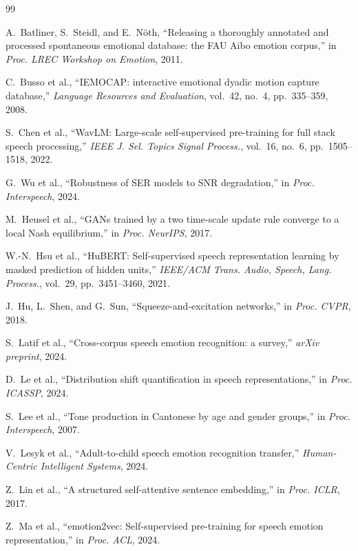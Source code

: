 \documentclass[11pt,a4paper]{article}
\begin{document}
\begin{thebibliography}{99}

A.~Batliner, S.~Steidl, and E.~N\"{o}th,
``{R}eleasing a thoroughly annotated and processed spontaneous emotional database: the {FAU Aibo} emotion corpus,''
in \textit{Proc. LREC Workshop on Emotion}, 2011.

C.~Busso et al.,
``{IEMOCAP}: interactive emotional dyadic motion capture database,''
\textit{Language Resources and Evaluation}, vol.~42, no.~4, pp.~335--359, 2008.

S.~Chen et al.,
``{WavLM}: Large-scale self-supervised pre-training for full stack speech processing,''
\textit{IEEE J. Sel. Topics Signal Process.}, vol.~16, no.~6, pp.~1505--1518, 2022.

G.~Wu et al.,
``Robustness of SER models to SNR degradation,''
in \textit{Proc. Interspeech}, 2024.

M.~Heusel et al.,
``{GANs} trained by a two time-scale update rule converge to a local {Nash} equilibrium,''
in \textit{Proc. NeurIPS}, 2017.

W.-N.~Hsu et al.,
``{HuBERT}: Self-supervised speech representation learning by masked prediction of hidden units,''
\textit{IEEE/ACM Trans. Audio, Speech, Lang. Process.}, vol.~29, pp.~3451--3460, 2021.

J.~Hu, L.~Shen, and G.~Sun,
``{S}queeze-and-excitation networks,''
in \textit{Proc. CVPR}, 2018.

S.~Latif et al.,
``Cross-corpus speech emotion recognition: a survey,''
\textit{arXiv preprint}, 2024.

D.~Le et al.,
``{D}istribution shift quantification in speech representations,''
in \textit{Proc. ICASSP}, 2024.

S.~Lee et al.,
``{T}one production in {C}antonese by age and gender groups,''
in \textit{Proc. Interspeech}, 2007.

V.~Lesyk et al.,
``{A}dult-to-child speech emotion recognition transfer,''
\textit{Human-Centric Intelligent Systems}, 2024.

Z.~Lin et al.,
``{A} structured self-attentive sentence embedding,''
in \textit{Proc. ICLR}, 2017.

Z.~Ma et al.,
``{emotion2vec}: Self-supervised pre-training for speech emotion representation,''
in \textit{Proc. ACL}, 2024.


\end{thebibliography}
\end{document}
